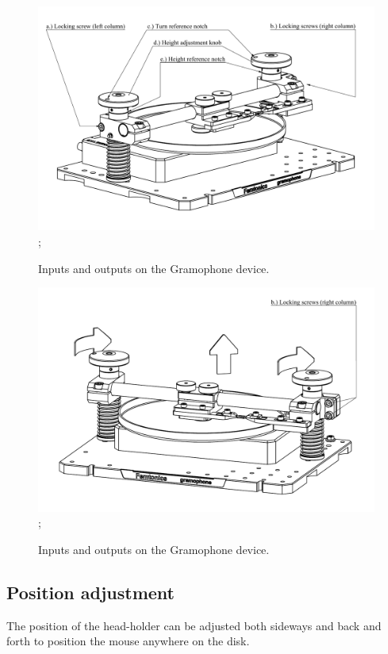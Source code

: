 \documentclass[11pt,a4paper]{article}
\begin{document}
\begin{figure}[H] %
\centering
\includegraphics[clip, trim=0cm 0cm 0cm 1cm, width=1.00\textwidth]{labels_height_1.PDF};
\caption{Inputs and outputs on the Gramophone device.}
\label{fig:gram_height_1}
\end{figure}

\begin{figure}[H] %
\centering
\includegraphics[clip, trim=1cm 1cm 0cm 0cm, width=1.00\textwidth]{labels_height_2.PDF};
\caption{Inputs and outputs on the Gramophone device.}
\label{fig:gram_height_2}
\end{figure}



\subsection{Position adjustment}
The position of the head-holder can be adjusted both sideways and back and forth to position the mouse anywhere on the disk.
\end{document}
